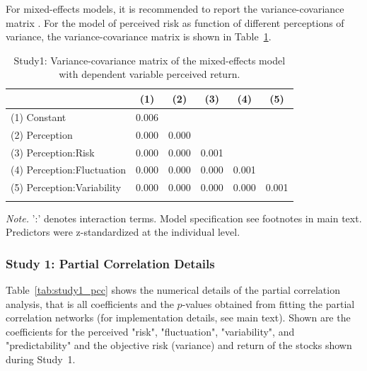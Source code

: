 For mixed-effects models, it is recommended to report the variance-covariance matrix \cite{Barr2013}. For the model of perceived risk as function of different perceptions of variance, the variance-covariance matrix is shown in Table~\ref{sup:tab:study_1_vcovmat}. 

\begin{table}[H]
\begin{center}
\begin{threeparttable}
\caption{Study1: Variance-covariance matrix of the mixed-effects model with dependent variable perceived return.}
\label{sup:tab:study_1_vcovmat}
\begin{tabular}{llllll}
\toprule
 & \multicolumn{1}{c}{(1)} & \multicolumn{1}{c}{(2)} & \multicolumn{1}{c}{(3)} & \multicolumn{1}{c}{(4)} & \multicolumn{1}{c}{(5)}\\
\midrule
(1) Constant & 0.006 &  &  &  & \\
(2) Perception & 0.000 & 0.000 &  &  & \\
(3) Perception:Risk & 0.000 & 0.000 & 0.001 &  & \\
(4) Perception:Fluctuation & 0.000 & 0.000 & 0.000 & 0.001 & \\
(5) Perception:Variability & 0.000 & 0.000 & 0.000 & 0.000 & 0.001\\
\bottomrule
\addlinespace
\end{tabular}
\begin{tablenotes}[para]
\normalsize{\textit{Note.}  ':' denotes interaction terms. Model specification see footnotes in main text. Predictors were z-standardized at the individual level.}
\end{tablenotes}
\end{threeparttable}
\end{center}
\end{table}

\subsubsection{Study 1: Partial Correlation Details}
Table~\ref{tab:study1_pcc} shows the numerical details of the partial correlation analysis, that is all coefficients and the $p$-values obtained from fitting the partial correlation networks (for implementation details, see main text). Shown are the coefficients for the perceived "risk", "fluctuation", "variability", and "predictability" and the objective risk (variance) and return of the stocks shown during Study~1.

